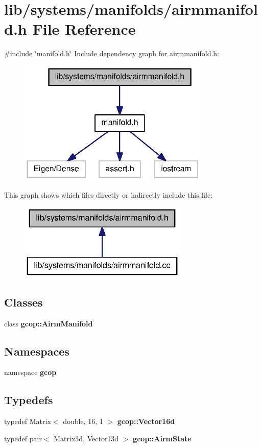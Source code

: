 \section{lib/systems/manifolds/airmmanifold.h \-File \-Reference}
\label{airmmanifold_8h}
{\ttfamily \#include \char`\"{}manifold.\-h\char`\"{}}\*
\-Include dependency graph for airmmanifold.\-h\-:
\nopagebreak
\begin{figure}[H]
\begin{center}
\leavevmode
\includegraphics[width=258pt]{airmmanifold_8h__incl}
\end{center}
\end{figure}
\-This graph shows which files directly or indirectly include this file\-:
\nopagebreak
\begin{figure}[H]
\begin{center}
\leavevmode
\includegraphics[width=228pt]{airmmanifold_8h__dep__incl}
\end{center}
\end{figure}
\subsection*{\-Classes}
\begin{DoxyCompactItemize}
\item 
class {\bf gcop\-::\-Airm\-Manifold}
\end{DoxyCompactItemize}
\subsection*{\-Namespaces}
\begin{DoxyCompactItemize}
\item 
namespace {\bf gcop}
\end{DoxyCompactItemize}
\subsection*{\-Typedefs}
\begin{DoxyCompactItemize}
\item 
typedef \-Matrix$<$ double, 16, 1 $>$ {\bf gcop\-::\-Vector16d}
\item 
typedef pair$<$ \-Matrix3d, \-Vector13d $>$ {\bf gcop\-::\-Airm\-State}
\end{DoxyCompactItemize}
